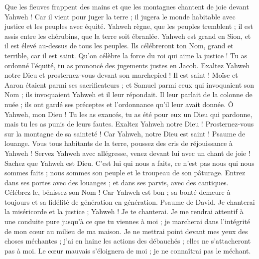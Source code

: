 \begin{multicols}{2}
Que les fleuves frappent des mains et que les montagnes chantent de joie
devant Yahweh ! Car il vient pour juger la terre ; il jugera le monde habitable avec justice et les peuples avec équité.
\VerseOne{}Yahweh règne, que les peuples tremblent ; il est assis entre les chérubins, que la terre soit ébranlée.
Yahweh est grand en Sion, et il est élevé au-dessus de tous les peuples.
Ils célébreront ton Nom, grand et terrible, car il est saint.
Qu'on célèbre la force du roi qui aime la justice ! Tu as ordonné l'équité, tu as prononcé des jugements justes en Jacob.
Exaltez Yahweh notre Dieu et prosternez-vous devant son marchepied ! Il est saint !
Moïse et Aaron étaient parmi ses sacrificateurs ; et Samuel parmi ceux qui invoquaient son Nom ; ils invoquaient Yahweh et il leur répondait.
Il leur parlait de la colonne de nuée ; ils ont gardé ses préceptes et l'ordonnance qu'il leur avait donnée.
Ô Yahweh, mon Dieu ! Tu les as exaucés, tu as été pour eux un Dieu qui pardonne, mais tu les as punis de leurs fautes.
Exaltez Yahweh notre Dieu ! Prosternez-vous sur la montagne de sa sainteté ! Car Yahweh, notre Dieu est saint !
\VerseOne{}Psaume de louange. Vous tous habitants de la terre, poussez des cris de réjouissance à Yahweh !
Servez Yahweh avec allégresse, venez devant lui avec un chant de joie !
Sachez que Yahweh est Dieu. C'est lui qui nous a faits, ce n'est pas nous qui nous sommes faits ; nous sommes son peuple et le troupeau de son pâturage.
Entrez dans ses portes avec des louanges ; et dans ses parvis, avec des cantiques. Célébrez-le, bénissez son Nom !
Car Yahweh est bon ; sa bonté demeure à toujours et sa fidélité de génération en génération.
\VerseOne{}Psaume de David. Je chanterai la miséricorde et la justice ; Yahweh ! Je te chanterai.
Je me rendrai attentif à une conduite pure jusqu'à ce que tu viennes à moi ; je marcherai dans l'intégrité de mon cœur au milieu de ma maison.
Je ne mettrai point devant mes yeux des choses méchantes ; j'ai en haine les actions des débauchés ; elles ne s'attacheront pas à moi.
Le cœur mauvais s'éloignera de moi ; je ne connaîtrai pas le méchant.

\end{multicols}
